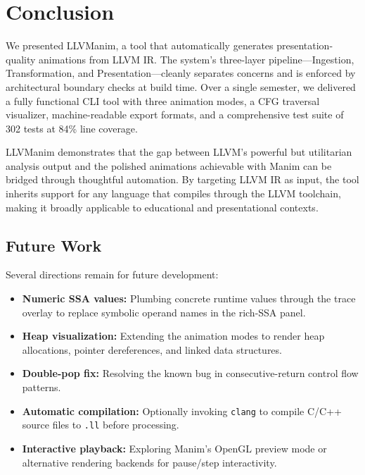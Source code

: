 \section{Conclusion}
We presented LLVManim, a tool that automatically generates presentation-quality animations from LLVM IR. The system's three-layer pipeline---Ingestion, Transformation, and Presentation---cleanly separates concerns and is enforced by architectural boundary checks at build time. Over a single semester, we delivered a fully functional CLI tool with three animation modes, a CFG traversal visualizer, machine-readable export formats, and a comprehensive test suite of 302 tests at 84\% line coverage.

LLVManim demonstrates that the gap between LLVM's powerful but utilitarian analysis output and the polished animations achievable with Manim can be bridged through thoughtful automation. By targeting LLVM IR as input, the tool inherits support for any language that compiles through the LLVM toolchain, making it broadly applicable to educational and presentational contexts.

\subsection{Future Work}
Several directions remain for future development:
\begin{itemize}
    \item \textbf{Numeric SSA values:} Plumbing concrete runtime values through the trace overlay to replace symbolic operand names in the rich-SSA panel.
    \item \textbf{Heap visualization:} Extending the animation modes to render heap allocations, pointer dereferences, and linked data structures.
    \item \textbf{Double-pop fix:} Resolving the known bug in consecutive-return control flow patterns.
    \item \textbf{Automatic compilation:} Optionally invoking \texttt{clang} to compile C/C++ source files to \texttt{.ll} before processing.
    \item \textbf{Interactive playback:} Exploring Manim's OpenGL preview mode or alternative rendering backends for pause/step interactivity.
\end{itemize}
